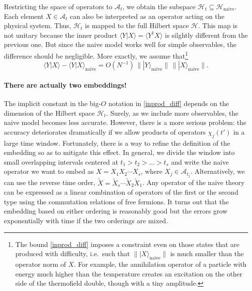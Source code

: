 \documentclass[12pt]{article}
\newcommand*{\kett}[1]{|{#1}\rangle}
\newcommand*{\brakett}[2]{\langle{#1}|{#2}\rangle}
\newcommand*{\corr}[1]{\langle{#1}\rangle}
\newcommand{\calA}{\mathcal{A}}
\newcommand{\calH}{\mathcal{H}}
\newcommand{\naive}{\text{naive}}
\def\ie{i.e.\ }
\begin{document}
Restricting the space of operators to $\calA_{t}$, we obtain the subspace $\calH_{t}\subseteq\calH_\naive$. Each element $X\in\calA_{t}$ can also be interpreted as an operator acting on the physical system. Thus, $\calH_{t}$ is mapped to the full Hilbert space $\calH$. This map is not unitary because the inner product $\brakett{Y}{X}=\corr{Y^{\dag}X}$ is silghtly different from the previous one. But since the naive model works well for simple observables, the difference should be negligible. More exactly, we assume that\footnote{The bound \eqref{inprod_diff} imposes a constraint even on those states that are produced with difficulty, \ie such that $\bigl\|\kett{X}_\naive\bigr\|$ is much smaller than the operator norm of $X$. For example, the annihilation operator of a particle with energy much higher than the temperature creates an excitation on the other side of the thermofield double, though with a tiny amplitude.}
\begin{equation}\label{inprod_diff}
\brakett{Y}{X}-\brakett{Y}{X}_\naive
= O(N^{-1})\,\bigl\|\kett{Y}_\naive\bigr\|\,\bigl\|\kett{X}_\naive\bigr\|.
\end{equation}

\paragraph{There are actually two embeddings!}
The implicit constant in the big-$O$ notation in \eqref{inprod_diff} depends on the dimension of the Hilbert space $\calH_{t}$. Surely, as we include more observables, the naive model becomes less accurate. However, there is a more serious problem: the accuracy deteriorates dramatically if we allow products of operators $\chi_j(t')$ in a large time window. Fortunately, there is a way to refine the definition of the embedding so as to mitigate this effect. In general, we divide the window into small overlapping intervals centered at $t_1>t_2>\dots>t_s$ and write the naive operator we want to embed as $X=X_1X_2\cdots X_s$, where $X_j\in\calA_{t_j}$. Alternatively, we can use the reverse time order, $\tilde{X}=\tilde{X}_s\cdots\tilde{X}_2\tilde{X}_1$. Any operator of the naive theory can be expressed as a linear combination of operators of the first or the second type using the commutation relations of free fermions. It turns out that the embedding based on either ordering is reasonably good but the errors grow exponentially with time if the two orderings are mixed.
\end{document}
